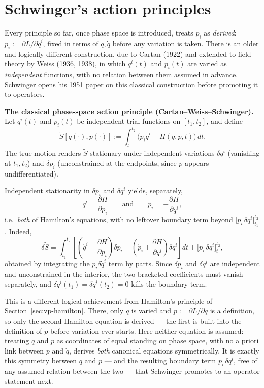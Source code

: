 \section{Schwinger's action principles}
\label{sec:vp-schwinger}

Every principle so far, once phase space is introduced, treats $p_i$ as
\emph{derived}: $p_i:=\partial L/\partial\dot q^i$, fixed in terms of $q,\dot
q$ before any variation is taken. There is an older and logically different
construction, due to Cartan (1922) and extended to field theory by Weiss (1936,
1938), in which $q^i(t)$ and $p_i(t)$ are varied as \emph{independent}
functions, with no relation between them assumed in advance. Schwinger opens
his 1951 paper on this classical construction before promoting it to operators.

\begin{definition}
\textbf{The classical phase-space action principle (Cartan--Weiss--Schwinger).}
    Let $q^i(t)$ and $p_i(t)$ be independent trial functions on $[t_1,t_2]$,
    and define
\[
\tilde S[q(\cdot),p(\cdot)] := \int_{t_1}^{t_2}\big(p_i\dot q^i - H(q,p,t)\big)\,dt .
\]
The true motion renders $\tilde S$ stationary under independent variations
    $\delta q^i$ (vanishing at $t_1,t_2$) and $\delta p_i$ (unconstrained at
    the endpoints, since $p$ appears undifferentiated).
\end{definition}

Independent stationarity in $\delta p_i$ and $\delta q^i$ yields, separately,
\[
\dot q^i = \frac{\partial H}{\partial p_i}
\qquad\text{and}\qquad
\dot p_i = -\frac{\partial H}{\partial q^i},
\]
i.e.\ \emph{both} of Hamilton's equations, with no leftover boundary term
beyond $\big[p_i\,\delta q^i\big]_{t_1}^{t_2}$. Indeed,
\[
\delta\tilde S = \int_{t_1}^{t_2}\left[\left(\dot q^i - 
\frac{\partial H}{\partial p_i}\right)\delta p_i - \left(\dot p_i + 
\frac{\partial H}{\partial q^i}\right)\delta q^i\right]dt + 
\big[p_i\,\delta q^i\big]_{t_1}^{t_2},
\]
obtained by integrating the $p_i\delta\dot q^i$ term by parts. Since $\delta
p_i$ and $\delta q^i$ are independent and unconstrained in the interior, the
two bracketed coefficients must vanish separately, and $\delta q^i(t_1)=\delta
q^i(t_2)=0$ kills the boundary term.

This is a different logical achievement from Hamilton's principle of
Section~\ref{sec:vp-hamilton}. There, only $q$ is varied and $p:=\partial
L/\partial\dot q$ is a definition, so only the second Hamilton equation is
derived --- the first is built into the definition of $p$ before variation ever
starts. Here neither equation is assumed: treating $q$ and $p$ as coordinates
of equal standing on phase space, with no a priori link between $p$ and $\dot
q$, derives \emph{both} canonical equations symmetrically. It is exactly this
symmetry between $q$ and $p$ --- and the resulting boundary term $p_i\,\delta
q^i$, free of any assumed relation between the two --- that Schwinger promotes
to an operator statement next.

